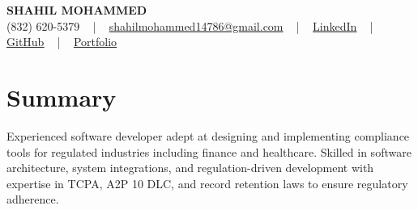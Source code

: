 \documentclass[letterpaper,10pt]{article}
\begin{document}
\begin{center}
    {\fontsize{14pt}{12pt}\selectfont \textbf{\MakeUppercase{Shahil Mohammed}}}\\ \vspace{2pt}
    \fontsize{10pt}{12pt}\selectfont (832) 620-5379 ~ | ~ \href{mailto:shahilmohammed14786@gmail.com}{shahilmohammed14786@gmail.com} ~ | ~  
    \href{https://www.linkedin.com/in/shahil-mohammed-9652931a1/}{\color{blue}\underline{LinkedIn}}  ~ | ~ 
    \href{https://github.com/freakbeast14}{\color{blue}\underline{GitHub}} ~ | ~ 
    \href{https://shahil-mohammed.netlify.app/}{\color{blue}\underline{Portfolio}}
    \vspace{-8pt}
\end{center}

\section{Summary}
\vspace{-2pt}\fontsize{8pt}{9pt}\selectfont
Experienced software developer adept at designing and implementing compliance tools for regulated industries including finance and healthcare. Skilled in software architecture, system integrations, and regulation-driven development with expertise in TCPA, A2P 10 DLC, and record retention laws to ensure regulatory adherence.
 \vspace{-5pt}
 
\vspace{-2pt}
\end{document}
